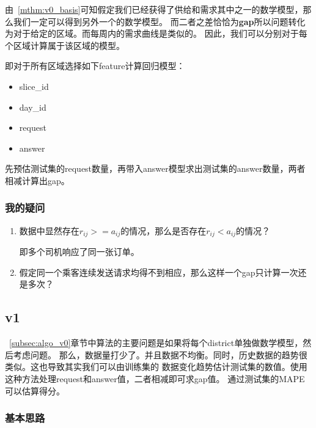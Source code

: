 \documentclass[hyperref,UTF8]{ctexart}
\theoremstyle{definition}
\theoremstyle{remark}
\numberwithin{equation}{subsection}
\newcommand{\Emph}{\textbf}
\begin{document}
	由~\ref{mthm:v0_basis}可知假定我们已经获得了供给和需求其中之一的数学模型，那么我们一定可以得到另外一个的数学模型。
	而二者之差恰恰为\Emph{gap}所以问题转化为对于给定的区域。而每周内的需求曲线是类似的。
	因此，我们可以分别对于每个区域计算属于该区域的模型。
	
	即对于所有区域选择如下feature计算回归模型：
	\begin{itemize}
		\item slice\_id
		\item day\_id
		\item request
		\item answer
	\end{itemize}
	
	先预估测试集的request数量，再带入answer模型求出测试集的answer数量，两者相减计算出gap。
	
\subsubsection{我的疑问}

	\begin{enumerate}[(1)]
		
		\item 数据中显然存在$r_{ij} >= a_{ij}$的情况，那么是否存在$r_{ij} < a_{ij}$的情况？
		
		即多个司机响应了同一张订单。
		
		\item 假定同一个乘客连续发送请求均得不到相应，那么这样一个gap只计算一次还是多次？
		
	\end{enumerate}
	
\subsection{v1}

	~\ref{subsec:algo_v0}章节中算法的主要问题是如果将每个district单独做数学模型，然后考虑问题。
	那么，数据量打少了。并且数据不均衡。同时，历史数据的趋势很类似。这也导致其实我们可以由训练集的
	数据变化趋势估计测试集的数值。使用这种方法处理request和answer值，二者相减即可求gap值。
	通过测试集的MAPE可以估算得分。
	
\subsubsection{基本思路}

	
	
\end{document}
